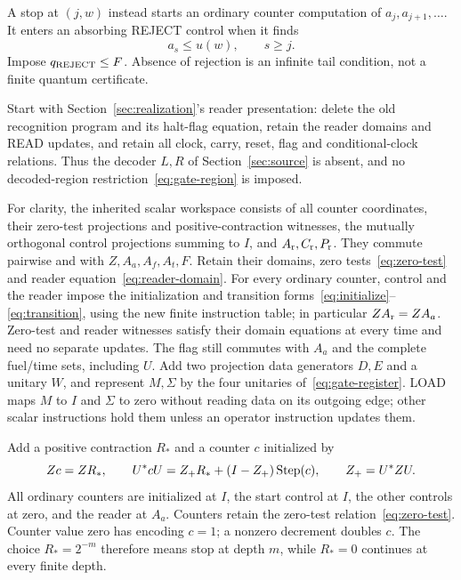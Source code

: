 A stop at $(j,w)$ instead starts an ordinary counter computation of $a_j,a_{j+1},\ldots$. It enters an absorbing REJECT control when it finds
\begin{equation}\label{eq:stop-reject-test}
 a_s\le u(w),\qquad s\ge j.
\end{equation}
Impose $q_{\rm REJECT}\le F$. Absence of rejection is an infinite tail condition, not a finite quantum certificate.

Start with Section~\ref{sec:realization}'s reader presentation: delete the old recognition program and its halt-flag equation, retain the reader domains and READ updates, and retain all clock, carry, reset, flag and conditional-clock relations. Thus the decoder $L,R$ of Section~\ref{sec:source} is absent, and no decoded-region restriction~\eqref{eq:gate-region} is imposed.

For clarity, the inherited scalar workspace consists of all counter coordinates, their zero-test projections and positive-contraction witnesses, the mutually orthogonal control projections summing to $I$, and $A_{\rm r},C_{\rm r},P_{\rm r}$. They commute pairwise and with $Z,A_a,A_f,A_t,F$. Retain their domains, zero tests~\eqref{eq:zero-test} and reader equation~\eqref{eq:reader-domain}. For every ordinary counter, control and the reader impose the initialization and transition forms~\eqref{eq:initialize}--\eqref{eq:transition}, using the new finite instruction table; in particular $ZA_{\rm r}=ZA_a$. Zero-test and reader witnesses satisfy their domain equations at every time and need no separate updates. The flag still commutes with $A_a$ and the complete fuel/time sets, including $U$. Add two projection data generators $D,E$ and a unitary $W$, and represent $M,\Sigma$ by the four unitaries of~\eqref{eq:gate-register}. LOAD maps $M$ to $I$ and $\Sigma$ to zero without reading data on its outgoing edge; other scalar instructions hold them unless an operator instruction updates them.

Add a positive contraction $R_*$ and a counter $c$ initialized by
\begin{equation}\label{eq:stop-counter-init}
 Zc=ZR_*,\qquad
 U^*cU=Z_+R_*+(I-Z_+)\operatorname{Step}(c),\qquad Z_+=U^*ZU.
\end{equation}
All ordinary counters are initialized at $I$, the start control at $I$, the other controls at zero, and the reader at $A_a$. Counters retain the zero-test relation~\eqref{eq:zero-test}. Counter value zero has encoding $c=1$; a nonzero decrement doubles $c$. The choice $R_*=2^{-m}$ therefore means stop at depth $m$, while $R_*=0$ continues at every finite depth.

